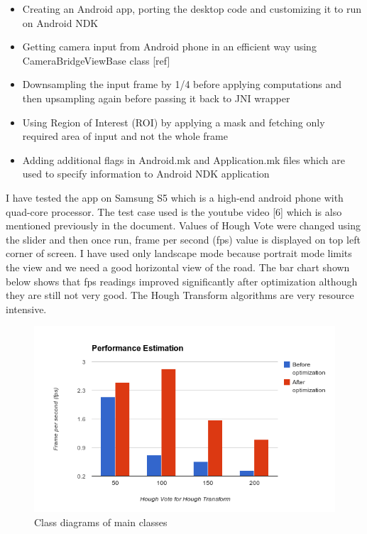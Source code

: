 \begin{itemize}
        \item Creating an Android app, porting the desktop code and customizing it to run on Android NDK
        \item Getting camera input from Android phone in an efficient way using CameraBridgeViewBase class [ref]
        \item Downsampling the input frame by 1/4 before applying computations and then upsampling again before passing it back to JNI wrapper
        \item Using Region of Interest (ROI) by applying a mask and fetching only required area of input and not the whole frame
        \item Adding additional flags in Android.mk and Application.mk files which are used to specify information to Android NDK application
\end{itemize}

I have tested the app on Samsung S5 which is a high-end android phone with quad-core processor. The test case used is the youtube video [6] which is also mentioned previously in the document. Values of Hough Vote were changed using the slider and then once run, frame per second (fps) value is displayed on top left corner of screen. I have used only landscape mode because portrait mode limits the view and we need a good horizontal view of the road. The bar chart shown below shows that fps readings improved significantly after optimization although they are still not very good. The Hough Transform algorithms are very resource intensive. 

\begin{figure}
\begin{center}
    \includegraphics[scale=0.6]{img/lane15.png}
\end{center}
\caption{Class diagrams of main classes}
\end{figure}

